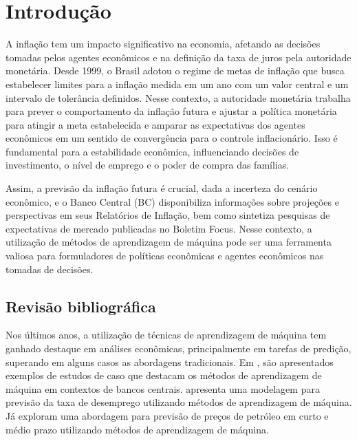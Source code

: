 
\chapter[Introdução]{Introdução}

A inflação tem um impacto significativo na economia, afetando as decisões tomadas pelos agentes econômicos e na definição da taxa de juros pela autoridade monetária. Desde 1999, o Brasil adotou o regime de metas de inflação que busca estabelecer limites para a inflação medida em um ano com um valor central e um intervalo de tolerância definidos. Nesse contexto, a autoridade monetária trabalha para prever o comportamento da inflação futura e ajustar a política monetária para atingir a meta estabelecida e amparar as expectativas dos agentes econômicos em um sentido de convergência para o controle inflacionário. Isso é fundamental para a estabilidade econômica, influenciando decisões de investimento, o nível de emprego e o poder de compra das famílias.

Assim, a previsão da inflação futura é crucial, dada a incerteza do cenário econômico, e o Banco Central (BC) disponibiliza informações sobre projeções e  perspectivas em seus Relatórios de Inflação, bem como sintetiza pesquisas de expectativas de mercado publicadas no Boletim Focus. Nesse contexto, a utilização de métodos de aprendizagem de máquina pode ser uma ferramenta valiosa para formuladores de políticas econômicas e agentes econômicos nas tomadas de decisões.

\section{Revisão bibliográfica}\label{sec-revisao-bibliografica}

Nos últimos anos, a utilização de técnicas de aprendizagem de máquina tem ganhado destaque em análises econômicas, principalmente em tarefas de predição, superando em alguns casos as abordagens tradicionais. Em , são apresentados exemplos de estudos de caso que destacam os métodos de aprendizagem de máquina em contextos de bancos centrais.  apresenta uma modelagem para previsão da taxa de desemprego utilizando métodos de aprendizagem de máquina. Já  exploram uma abordagem para previsão de preços de petróleo em curto e médio prazo utilizando métodos de aprendizagem de máquina.

